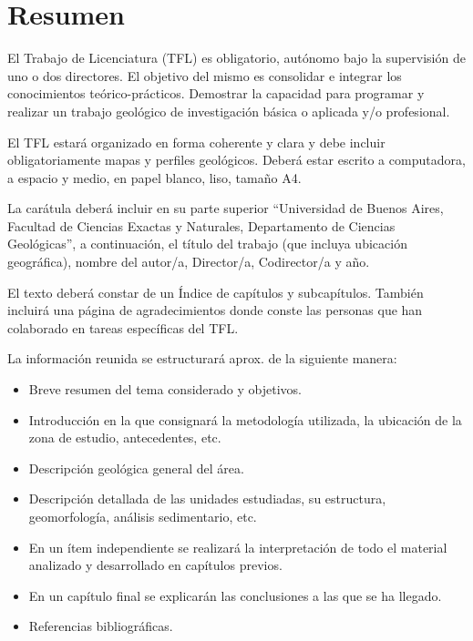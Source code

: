 \chapter*{Resumen}
El Trabajo de Licenciatura (TFL) es obligatorio, autónomo bajo la supervisión de uno o dos directores. El objetivo del mismo es consolidar e integrar los conocimientos teórico-prácticos. Demostrar la capacidad para programar y realizar un trabajo geológico de investigación básica o aplicada y/o profesional.\par
El TFL estará organizado en forma coherente y clara y debe incluir obligatoriamente mapas y perfiles geológicos. Deberá estar escrito a computadora, a espacio y medio, en papel blanco, liso, tamaño A4.\par
La carátula deberá incluir en su parte superior “Universidad de Buenos Aires, Facultad de Ciencias Exactas y Naturales, Departamento de Ciencias Geológicas”, a continuación, el título del trabajo (que incluya ubicación geográfica), nombre del autor/a, Director/a, Codirector/a y año.\par
El texto deberá constar de un Índice de capítulos y subcapítulos. También incluirá una página de agradecimientos donde conste las personas que han colaborado en tareas específicas del TFL.\par
La información reunida se estructurará aprox. de la siguiente manera:
\begin{itemize}
    \item Breve resumen del tema considerado y objetivos.
    \item Introducción en la que consignará la metodología utilizada, la ubicación de la zona de estudio, antecedentes, etc.
    \item Descripción geológica general del área.
    \item Descripción detallada de las unidades estudiadas, su estructura, geomorfología, análisis sedimentario, etc.
    \item En un ítem independiente se realizará la interpretación de todo el material analizado y desarrollado en capítulos previos.
    \item En un capítulo final se explicarán las conclusiones a las que se ha llegado.
    \item Referencias bibliográficas.
\end{itemize}

